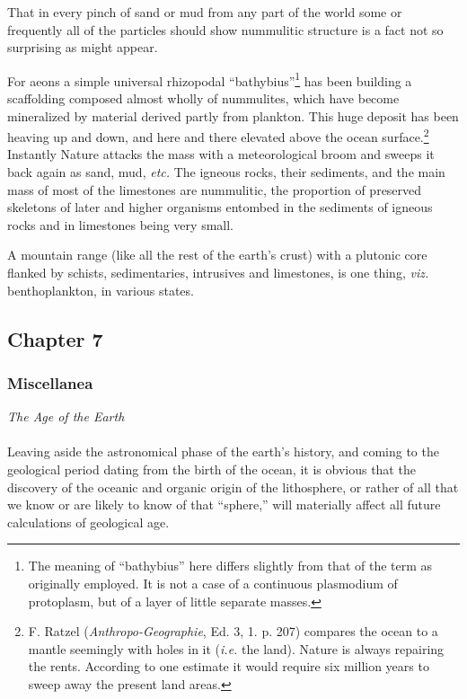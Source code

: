 \documentclass[a4paper, 12pt, oneside]{article}
\begin{document}
That in every pinch of sand or mud from any part of the world some or frequently all of the particles should show nummulitic structure is a fact not so surprising as might appear.

For aeons a simple universal rhizopodal ``bathybius''\footnote{The meaning of ``bathybius'' here differs slightly from that of the term as originally employed. It is not a case of a continuous plasmodium of protoplasm, but of a layer of little separate masses.} has been building a scaffolding composed almost wholly of nummulites, which have become mineralized by material derived partly from plankton. This huge deposit has been heaving up and down, and here and there elevated above the ocean surface.\footnote{F. Ratzel (\emph{Anthropo-Geographie}, Ed. 3, 1. p. 207) compares the ocean to a mantle seemingly with holes in it (\emph{i.e.} the land). Nature is always repairing the rents. According to one estimate it would require six million years to sweep away the present land areas.} Instantly Nature attacks the mass with a meteorological broom and sweeps it back again as sand, mud, \emph{etc.} The igneous rocks, their sediments, and the main mass of most of the limestones are nummulitic, the proportion of preserved skeletons of later and higher organisms entombed in the sediments of igneous rocks and in limestones being very small.

A mountain range (like all the rest of the earth's crust) with a plutonic core flanked by schists, sedimentaries, intrusives and limestones, is one thing, \emph{viz.} benthoplankton, in various states.
\clearpage
\subsection{Chapter 7}
\subsubsection{Miscellanea}
\centerline{\emph{The Age of the Earth}}
\paragraph{}
Leaving aside the astronomical phase of the earth's history, and coming to the geological period dating from the birth of the ocean, it is obvious that the discovery of the oceanic and organic origin of the lithosphere, or rather of all that we know or are likely to know of that ``sphere,'' will materially affect all future calculations of geological age.
\end{document}
